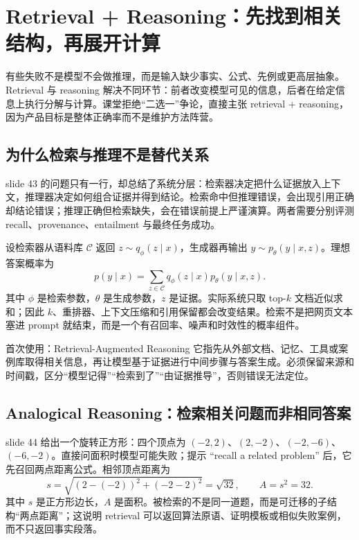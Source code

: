 \section{Retrieval + Reasoning：先找到相关结构，再展开计算}

有些失败不是模型不会做推理，而是输入缺少事实、公式、先例或更高层抽象。Retrieval 与 reasoning 解决不同环节：前者改变模型可见的信息，后者在给定信息上执行分解与计算。课堂拒绝“二选一”争论，直接主张 retrieval + reasoning，因为产品目标是整体正确率而不是维护方法阵营。

\subsection{为什么检索与推理不是替代关系}

slide 43 的问题只有一行，却总结了系统分层：检索器决定把什么证据放入上下文，推理器决定如何组合证据并得到结论。检索命中但推理错误，会出现引用正确却结论错误；推理正确但检索缺失，会在错误前提上严谨演算。两者需要分别评测 recall、provenance、entailment 与最终任务成功。


设检索器从语料库 $\mathcal C$ 返回 $z\sim q_\phi(z\mid x)$，生成器再输出 $y\sim p_\theta(y\mid x,z)$。理想答案概率为
\[
p(y\mid x)=\sum_{z\in\mathcal C}q_\phi(z\mid x)p_\theta(y\mid x,z).
\]
其中 $\phi$ 是检索参数，$\theta$ 是生成参数，$z$ 是证据。实际系统只取 top-$k$ 文档近似求和；因此 $k$、重排器、上下文压缩和引用保留都会改变结果。检索不是把网页文本塞进 prompt 就结束，而是一个有召回率、噪声和时效性的概率组件。

\begin{knowledgebox}{首次使用：Retrieval-Augmented Reasoning}
它指先从外部文档、记忆、工具或案例库取得相关信息，再让模型基于证据进行中间步骤与答案生成。必须保留来源和时间戳，区分“模型记得”“检索到了”“由证据推导”，否则错误无法定位。
\end{knowledgebox}

\subsection{Analogical Reasoning：检索相关问题而非相同答案}

slide 44 给出一个旋转正方形：四个顶点为 $(-2,2)$、$(2,-2)$、$(-2,-6)$、$(-6,-2)$。直接问面积时模型可能失败；提示 “recall a related problem” 后，它先召回两点距离公式。相邻顶点距离为
\[
s=\sqrt{(2-(-2))^2+(-2-2)^2}=\sqrt{32},
\qquad A=s^2=32.
\]
其中 $s$ 是正方形边长，$A$ 是面积。被检索的不是同一道题，而是可迁移的子结构“两点距离”；这说明 retrieval 可以返回算法原语、证明模板或相似失败案例，而不只返回事实段落。

